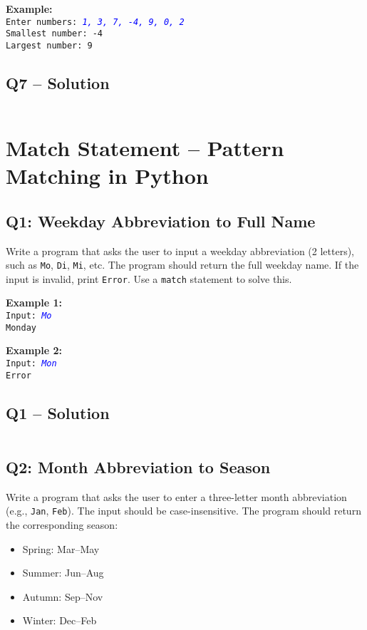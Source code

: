 \documentclass[a4paper,11pt]{article}
\begin{document}
	\textbf{Example:}\\
	\texttt{Enter numbers: \textcolor{blue}{\textit{1, 3, 7, -4, 9, 0, 2}}}\\
	\texttt{Smallest number: -4}\\
	\texttt{Largest number: 9}
	
		
	\subsection*{Q7 – Solution}
		\inputminted{python}{Files/1/7.py}
		
		\newpage
		
	\section{Match Statement – Pattern Matching in Python}
	
	\subsection*{Q1: Weekday Abbreviation to Full Name}
	Write a program that asks the user to input a weekday abbreviation (2 letters), such as \texttt{Mo}, \texttt{Di}, \texttt{Mi}, etc. The program should return the full weekday name. If the input is invalid, print \texttt{Error}. Use a \texttt{match} statement to solve this.
	
	\textbf{Example 1:}\\
	\texttt{Input: \textcolor{blue}{\textit{Mo}}}\\
	\texttt{Monday}
	
	\textbf{Example 2:}\\
	\texttt{Input: \textcolor{blue}{\textit{Mon}}}\\
	\texttt{Error}
	
		\subsection*{Q1 – Solution}
	\inputminted{python}{Files/2/1.py}
	
	\subsection*{Q2: Month Abbreviation to Season}
	Write a program that asks the user to enter a three-letter month abbreviation (e.g., \texttt{Jan}, \texttt{Feb}). The input should be case-insensitive. The program should return the corresponding season:
	
	\begin{itemize}
		\item Spring: Mar–May
		\item Summer: Jun–Aug
		\item Autumn: Sep–Nov
		\item Winter: Dec–Feb
	\end{itemize}
	
\end{document}

